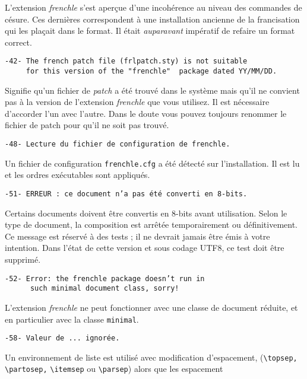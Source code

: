 \documentclass[a4paper,12pt,openright]{article}
\begin{document}
L’extension \textit{frenchle} s’est aperçue d’une incohérence au niveau des commandes
de césure. Ces dernières correspondent à une installation ancienne
de la francisation qui les plaçait dans le format. Il était {\em auparavant} impératif de refaire
un format correct.\\
\begin{verbatim}
-42- The french patch file (frlpatch.sty) is not suitable
     for this version of the "frenchle"  package dated YY/MM/DD.
\end{verbatim}
Signifie qu’un fichier de \textit{patch} a été trouvé dans le système mais qu’il ne
convient pas à la version de l’extension \textit{frenchle} que vous utilisez. Il est
nécessaire d’accorder l’un avec l’autre. Dans le doute vous pouvez toujours
renommer le fichier de patch pour qu’il ne soit pas trouvé.\\
\begin{verbatim}
-48- Lecture du fichier de configuration de frenchle.
\end{verbatim}
Un fichier de configuration \texttt{frenchle.cfg} a été détecté sur l’installation.
Il est lu et les ordres exécutables sont appliqués.\\
\begin{verbatim}
-51- ERREUR : ce document n’a pas été converti en 8-bits.
\end{verbatim}
Certains documents doivent être convertis en 8-bits avant utilisation. Selon
le type de document, la composition est arrêtée temporairement ou
définitivement. Ce message est réservé à des tests ; il ne devrait jamais
être émis à votre intention. Dans l'état de cette version et sous codage UTF8, ce test doit être supprimé.\\
\begin{verbatim}
-52- Error: the frenchle package doesn’t run in 
      such minimal document class, sorry!
\end{verbatim}
L’extension \textit{frenchle} ne peut fonctionner avec une classe de document
réduite, et en particulier avec la classe%
 \texttt{minimal}.\\
\begin{verbatim}
-58- Valeur de ... ignorée.
\end{verbatim}%
Un environnement de liste est utilisé avec modification d’espacement, 
(\verb|\topsep, \partosep,| \verb|\itemsep| ou \verb|\parsep|) alors que les espacement
\end{document}

